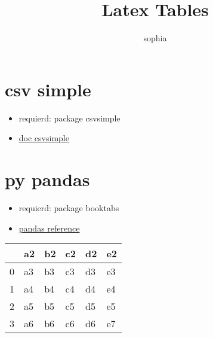 \documentclass[10pt]{article}
\title{Latex Tables}
\date{}
\author{sophia}
\begin{document}
 
\maketitle
\tableofcontents
 
\section{csv simple}
\begin{itemize}
    \item requierd: package csvsimple
    \item \href{https://mirror.dogado.de/tex-archive/macros/latex/contrib/csvsimple/csvsimple.pdf}{doc csvsimple}
\end{itemize}

\section{py pandas}
\begin{itemize}
    \item requierd: package booktabs
    \item \href{https://pandas.pydata.org/pandas-docs/stable/reference/api/pandas.DataFrame.to_latex.html}{pandas reference}
\end{itemize}
\begin{tabular}{llllll}
    \toprule
    {} &  a2 &  b2 &  c2 &  d2 &  e2 \\
    \midrule
    0 &  a3 &  b3 &  c3 &  d3 &  e3 \\
    1 &  a4 &  b4 &  c4 &  d4 &  e4 \\
    2 &  a5 &  b5 &  c5 &  d5 &  e5 \\
    3 &  a6 &  b6 &  c6 &  d6 &  e7 \\
    \bottomrule
    \end{tabular}
 
\end{document}
